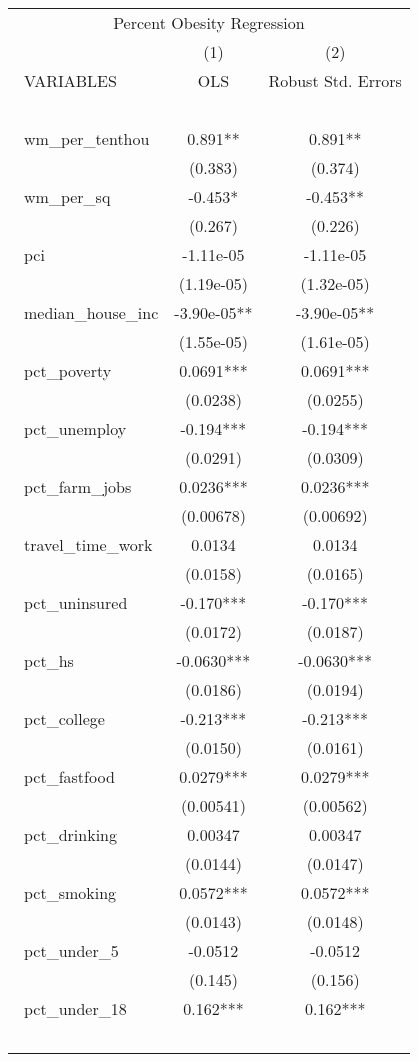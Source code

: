 \documentclass[]{article}
\begin{document}
\begin{tabular}{lcc}
\multicolumn{3}{c}{Percent Obesity Regression} \\\ \hline
 & (1) & (2) \\\
VARIABLES & OLS & Robust Std. Errors \\\ \hline
 &  &  \\\
wm\_per\_tenthou & 0.891** & 0.891** \\\
 & (0.383) & (0.374) \\\
wm\_per\_sq & -0.453* & -0.453** \\\
 & (0.267) & (0.226) \\\
pci & -1.11e-05 & -1.11e-05 \\\
 & (1.19e-05) & (1.32e-05) \\\
median\_house\_inc & -3.90e-05** & -3.90e-05** \\\
 & (1.55e-05) & (1.61e-05) \\\
pct\_poverty & 0.0691*** & 0.0691*** \\\
 & (0.0238) & (0.0255) \\\
pct\_unemploy & -0.194*** & -0.194*** \\\
 & (0.0291) & (0.0309) \\\
pct\_farm\_jobs & 0.0236*** & 0.0236*** \\\
 & (0.00678) & (0.00692) \\\
travel\_time\_work & 0.0134 & 0.0134 \\\
 & (0.0158) & (0.0165) \\\
pct\_uninsured & -0.170*** & -0.170*** \\\
 & (0.0172) & (0.0187) \\\
pct\_hs & -0.0630*** & -0.0630*** \\\
 & (0.0186) & (0.0194) \\\
pct\_college & -0.213*** & -0.213*** \\\
 & (0.0150) & (0.0161) \\\
pct\_fastfood & 0.0279*** & 0.0279*** \\\
 & (0.00541) & (0.00562) \\\
pct\_drinking & 0.00347 & 0.00347 \\\
 & (0.0144) & (0.0147) \\\
pct\_smoking & 0.0572*** & 0.0572*** \\\
 & (0.0143) & (0.0148) \\\
pct\_under\_5 & -0.0512 & -0.0512 \\\
 & (0.145) & (0.156) \\\
pct\_under\_18 & 0.162*** & 0.162*** \\\

\end{tabular}
\end{document}
